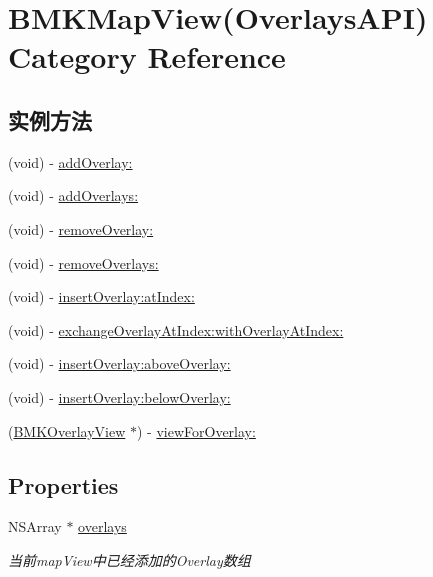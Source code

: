 \hypertarget{category_b_m_k_map_view_07_overlays_a_p_i_08}{\section{B\-M\-K\-Map\-View(Overlays\-A\-P\-I) Category Reference}
\label{category_b_m_k_map_view_07_overlays_a_p_i_08}
}
\subsection*{实例方法}
\begin{DoxyCompactItemize}
\item 
(void) -\/ \hyperlink{category_b_m_k_map_view_07_overlays_a_p_i_08_af85ad6091568df29d9e7c3dea82a1a2b}{add\-Overlay\-:}
\item 
(void) -\/ \hyperlink{category_b_m_k_map_view_07_overlays_a_p_i_08_ab7d29d948515cc6d947d6aa63f904168}{add\-Overlays\-:}
\item 
(void) -\/ \hyperlink{category_b_m_k_map_view_07_overlays_a_p_i_08_a3be1f2a019df3ff971f6a36f142e55be}{remove\-Overlay\-:}
\item 
(void) -\/ \hyperlink{category_b_m_k_map_view_07_overlays_a_p_i_08_a3eb7909fb1adce117c1de432fd5d816a}{remove\-Overlays\-:}
\item 
(void) -\/ \hyperlink{category_b_m_k_map_view_07_overlays_a_p_i_08_adc0775a2651c1e4099f93d9c1bbffe3d}{insert\-Overlay\-:at\-Index\-:}
\item 
(void) -\/ \hyperlink{category_b_m_k_map_view_07_overlays_a_p_i_08_a62c1c29b8e5b408ba0c40411a3c1f50f}{exchange\-Overlay\-At\-Index\-:with\-Overlay\-At\-Index\-:}
\item 
(void) -\/ \hyperlink{category_b_m_k_map_view_07_overlays_a_p_i_08_ad94b45c4df7978e3a6095918323496d3}{insert\-Overlay\-:above\-Overlay\-:}
\item 
(void) -\/ \hyperlink{category_b_m_k_map_view_07_overlays_a_p_i_08_a73dfe9f74d722b7b1fc477e791f34653}{insert\-Overlay\-:below\-Overlay\-:}
\item 
(\hyperlink{interface_b_m_k_overlay_view}{B\-M\-K\-Overlay\-View} $\ast$) -\/ \hyperlink{category_b_m_k_map_view_07_overlays_a_p_i_08_aa88093440ad22f7af9cf9a36051f662d}{view\-For\-Overlay\-:}
\end{DoxyCompactItemize}
\subsection*{Properties}
\begin{DoxyCompactItemize}
\item 
\hypertarget{category_b_m_k_map_view_07_overlays_a_p_i_08_a6c673c46ad9f146f80e48d82ebcf934b}{N\-S\-Array $\ast$ \hyperlink{category_b_m_k_map_view_07_overlays_a_p_i_08_a6c673c46ad9f146f80e48d82ebcf934b}{overlays}}\label{category_b_m_k_map_view_07_overlays_a_p_i_08_a6c673c46ad9f146f80e48d82ebcf934b}

\begin{DoxyCompactList}\small\item\em 当前map\-View中已经添加的\-Overlay数组 \end{DoxyCompactList}\end{DoxyCompactItemize}


